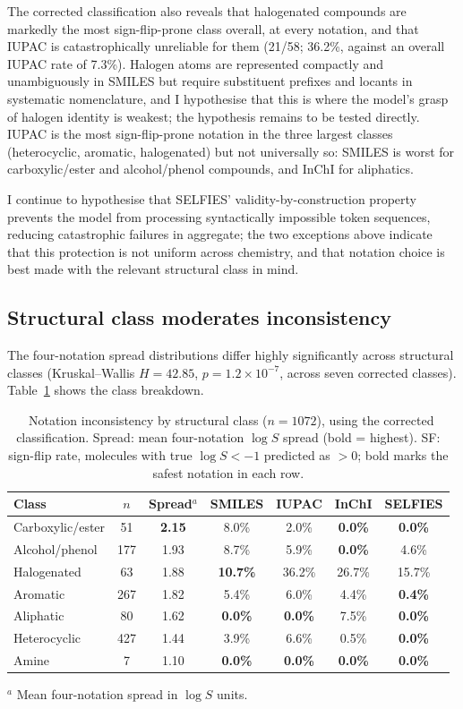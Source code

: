 \documentclass[twoside,twocolumn,9pt]{article}
\newcommand{\logS}{\ensuremath{\log S}}
\begin{document}
The corrected classification also reveals that halogenated compounds are markedly the most sign-flip-prone class overall, at every notation, and that IUPAC is catastrophically unreliable for them (21/58; 36.2\%, against an overall IUPAC rate of 7.3\%). Halogen atoms are represented compactly and unambiguously in SMILES but require substituent prefixes and locants in systematic nomenclature, and I hypothesise that this is where the model's grasp of halogen identity is weakest; the hypothesis remains to be tested directly. IUPAC is the most sign-flip-prone notation in the three largest classes (heterocyclic, aromatic, halogenated) but not universally so: SMILES is worst for carboxylic/ester and alcohol/phenol compounds, and InChI for aliphatics.

I continue to hypothesise that SELFIES' validity-by-construction property prevents the model from processing syntactically impossible token sequences, reducing catastrophic failures in aggregate; the two exceptions above indicate that this protection is not uniform across chemistry, and that notation choice is best made with the relevant structural class in mind.

\subsection{Structural class moderates inconsistency}

The four-notation spread distributions differ highly significantly across structural classes (Kruskal--Wallis $H=42.85$, $p=1.2\!\times\!10^{-7}$, across seven corrected classes). Table~\ref{tbl:class} shows the class breakdown.

\begin{table}[t]
\small
\caption{\ Notation inconsistency by structural class ($n=1072$), using the corrected classification. Spread: mean four-notation $\logS$ spread (bold = highest). SF: sign-flip rate, molecules with true $\logS<-1$ predicted as $>0$; bold marks the safest notation in each row.}
\label{tbl:class}
\begin{tabular*}{\textwidth}{@{\extracolsep{\fill}}lcccccc}
\hline
Class & $n$ & Spread$^a$ & SMILES & IUPAC & InChI & SELFIES \\
\hline
Carboxylic/ester & 51  & \textbf{2.15} & 8.0\% & 2.0\% & \textbf{0.0\%} & \textbf{0.0\%} \\
Alcohol/phenol   & 177 & 1.93 & 8.7\% & 5.9\% & \textbf{0.0\%} & 4.6\% \\
Halogenated      & 63  & 1.88 & \textbf{10.7\%} & 36.2\% & 26.7\% & 15.7\% \\
Aromatic         & 267 & 1.82 & 5.4\% & 6.0\% & 4.4\% & \textbf{0.4\%} \\
Aliphatic        & 80  & 1.62 & \textbf{0.0\%} & \textbf{0.0\%} & 7.5\% & \textbf{0.0\%} \\
Heterocyclic     & 427 & 1.44 & 3.9\% & 6.6\% & 0.5\% & \textbf{0.0\%} \\
Amine            & 7   & 1.10 & \textbf{0.0\%} & \textbf{0.0\%} & \textbf{0.0\%} & \textbf{0.0\%} \\
\hline
\end{tabular*}
$^a$ Mean four-notation spread in $\logS$ units.
\end{table}
\end{document}
